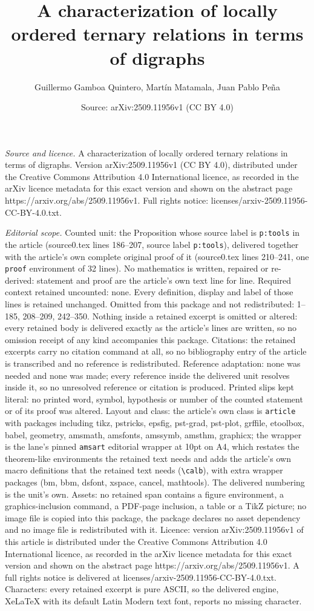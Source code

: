 \documentclass[10pt,a4paper]{amsart}
\title[A characterization of locally ordered ternary relations in t]{A characterization of locally ordered ternary relations in terms of digraphs}
\author{Guillermo Gamboa Quintero, Mart\'in Matamala, Juan Pablo Pe\~na}
\date{Source: arXiv:2509.11956v1 (CC BY 4.0)}
\begin{document}
\maketitle

\noindent\emph{Source and licence.} A characterization of locally ordered ternary relations in terms of digraphs. Version arXiv:2509.11956v1 (CC BY 4.0), distributed under the Creative Commons Attribution 4.0 International licence, as recorded in the arXiv licence metadata for this exact version and shown on the abstract page https://arxiv.org/abs/2509.11956v1. Full rights notice: licenses/arxiv-2509.11956-CC-BY-4.0.txt.\par\smallskip

\noindent\textit{Editorial scope.} Counted unit: the Proposition whose source label is \texttt{p:tools} in the article (source0.tex lines 186--207, source label \texttt{p:tools}), delivered together with the article's own complete original proof of it (source0.tex lines 210--241, one \texttt{proof} environment of 32 lines). No mathematics is written, repaired or re-derived: statement and proof are the article's own text line for line. Required context retained uncounted: none. Every definition, display and label of those lines is retained unchanged. Omitted from this package and not redistributed: 1--185, 208--209, 242--350. Nothing inside a retained excerpt is omitted or altered: every retained body is delivered exactly as the article's lines are written, so no omission receipt of any kind accompanies this package. Citations: the retained excerpts carry no citation command at all, so no bibliography entry of the article is transcribed and no reference is redistributed. Reference adaptation: none was needed and none was made; every reference inside the delivered unit resolves inside it, so no unresolved reference or citation is produced. Printed slips kept literal: no printed word, symbol, hypothesis or number of the counted statement or of its proof was altered. Layout and class: the article's own class is \texttt{article} with packages including tikz, pstricks, epsfig, pst-grad, pst-plot, grffile, etoolbox, babel, geometry, amsmath, amsfonts, amssymb, amsthm, graphicx; the wrapper is the lane's pinned \texttt{amsart} editorial wrapper at 10pt on A4, which restates the theorem-like environments the retained text needs and adds the article's own macro definitions that the retained text needs (\texttt{\textbackslash calb}), with extra wrapper packages (bm, bbm, dsfont, xspace, cancel, mathtools). The delivered numbering is the unit's own. Assets: no retained span contains a figure environment, a graphics-inclusion command, a PDF-page inclusion, a table or a TikZ picture; no image file is copied into this package, the package declares no asset dependency and no image file is redistributed with it. Licence: version arXiv:2509.11956v1 of this article is distributed under the Creative Commons Attribution 4.0 International licence, as recorded in the arXiv licence metadata for this exact version and shown on the abstract page https://arxiv.org/abs/2509.11956v1. A full rights notice is delivered at licenses/arxiv-2509.11956-CC-BY-4.0.txt. Characters: every retained excerpt is pure ASCII, so the delivered engine, XeLaTeX with its default Latin Modern text font, reports no missing character.
\end{document}
